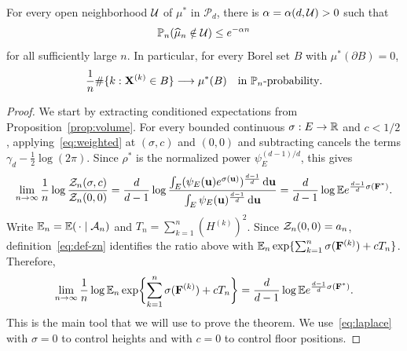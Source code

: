 \documentclass[11pt,letterpaper]{article}
\begin{document}
\begin{theorem}
      \label{prop:empirical-limit}\label{thm:empirical-limit}\label{thm:distribution}
      For every open neighborhood $\mathcal U$ of $\mu^\ast$ in $\mathcal P_d$, there is $\alpha=\alpha(d,\mathcal U)>0$ such that
      \begin{equation}\label{eq:empirical}
            \mathbb P_n(\widehat\mu_n\notin\mathcal U)\le e^{-\alpha n}
      \end{equation}
      for all sufficiently large $n$. In particular, for every Borel set $B$ with $\mu^\ast(\partial B)=0$,
      \[
            \frac1n\#\{k:\mathbf X^{(k)}\in B\}\longrightarrow\mu^\ast(B)
            \quad\text{in }\mathbb P_n\text{-probability}.
      \]
\end{theorem}
\begin{proof}
      We start by extracting conditioned expectations from Proposition~\ref{prop:volume}.
      For every bounded continuous $\sigma:E\to\mathbb R$ and $c<1/2$, applying~\eqref{eq:weighted} at $(\sigma,c)$ and $(0,0)$ and subtracting cancels the terms $\gamma_d-\frac12\log(2\pi)$. Since $\rho^\ast$ is the normalized power $\psi_E^{(d-1)/d}$, this gives
      \[
            \lim_{n\to\infty}\frac1n \log \frac{\mathcal Z_n(\sigma,c)}{\mathcal Z_n(0,0)} = \frac{d}{d-1}\log\frac{\int_E(\psi_E(\mathbf u)e^{\sigma(\mathbf u)})^{\frac{d-1}d}\,\mathrm d\mathbf u}{\int_E \psi_E(\mathbf u)^{\frac{d-1}d}\,\mathrm d\mathbf u}=\frac{d}{d-1}\log\mathbb E e^{\frac{d-1}{d}\sigma(\mathbf F^\ast)}.
      \]
      Write $\mathbb E_n=\mathbb E(\,\cdot\mid\mathcal A_n)$ and $T_n=\sum_{k=1}^n(H^{(k)})^2$. Since $\mathcal Z_n(0,0)=a_n$, definition~\eqref{eq:def-zn} identifies the ratio above with $\mathbb E_n\exp\{\sum_{k=1}^n\sigma(\mathbf F^{(k)})+cT_n\}$. Therefore,
      \begin{equation}\label{eq:laplace}
            \lim_{n\to\infty}\frac1n\log\mathbb E_n \exp\biggl\{\sum_{k=1}^n\sigma(\mathbf F^{(k)})+cT_n\biggr\}
            =\frac d{d-1}\log\mathbb E e^{\frac{d-1}{d}\sigma(\mathbf F^\ast)}.
      \end{equation}
      This is the main tool that we will use to prove the theorem. We use~\eqref{eq:laplace} with $\sigma=0$ to control heights and with $c=0$ to control floor positions.


\end{proof}
\end{document}

